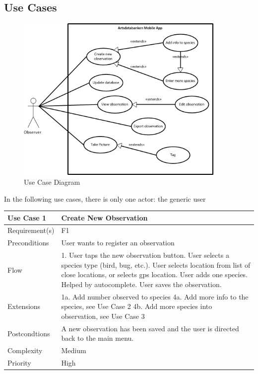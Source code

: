 \subsection{Use Cases}
\begin{figure}[htb]
	\centering
	\includegraphics[width=0.9\textwidth]{reqspec/mainusecase.jpg}
	\caption{Use Case Diagram}
	\label{fig:usecase}
\end{figure}

In the following use cases, there is only one actor: the generic user

\begin{tabular}[t]{|l|p{}|}\hline
	Use Case 1&Create New Observation\\\hline
	Requirement(s)&F1\\\hline
	Preconditions&User wants to register an observation\\\hline
	Flow&1. User taps the new observation button\newline
	2. User selects a species type (bird, bug, etc.)\newline
	3. User selects location from list of close locations, or selects gps location\newline
	4. User adds one species. Helped by autocomplete\newline
	5. User saves the observation.\\\hline
	Extensions& 1a. Add number observed to species\newline
	4a. Add more info to the species, see Use Case 2\newline
	4b. Add more species into observation, see Use Case 3\\\hline
	Postcondtions&A new observation has been saved and the user is directed back to the main menu.\\\hline
	Complexity&Medium\\\hline
	Priority&High\\\hline
\end{tabular}

